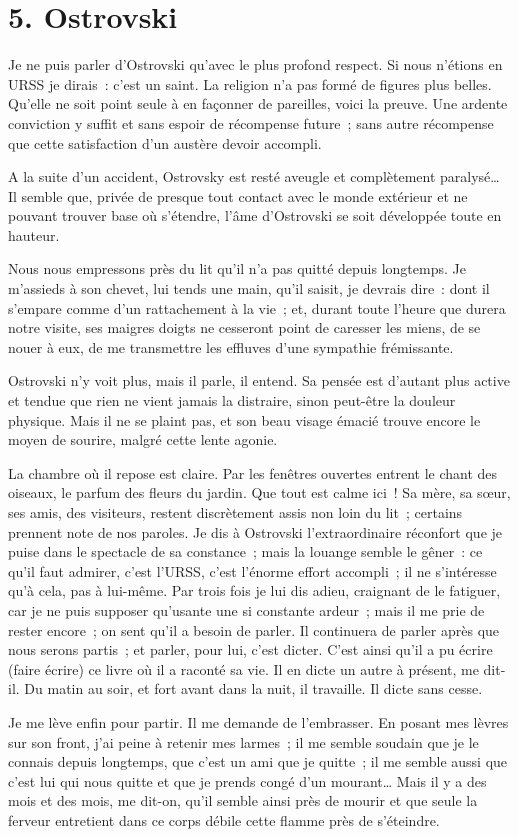 \documentclass[twoside]{book} %
\begin{document}
\section[{5. Ostrovski}]{5. Ostrovski}

\noindent Je ne puis parler d’Ostrovski qu’avec le plus profond respect. Si nous n’étions en URSS je dirais : c’est un saint. La religion n’a pas formé de figures plus belles. Qu’elle ne soit point seule à en façonner de pareilles, voici la preuve. Une ardente conviction y suffit et sans espoir de récompense future ; sans autre récompense que cette satisfaction d’un austère devoir accompli.\par
A la suite d’un accident, Ostrovsky est resté aveugle et complètement paralysé… Il semble que, privée de presque tout contact avec le monde extérieur et ne pouvant trouver base où s’étendre, l’âme d’Ostrovski se soit développée toute en hauteur.\par
Nous nous empressons près du lit qu’il n’a pas quitté depuis longtemps. Je m’assieds à son chevet, lui tends une main, qu’il saisit, je devrais dire : dont il s’empare comme d’un rattachement à la vie ; et, durant toute l’heure que durera notre visite, ses maigres doigts ne cesseront point de caresser les miens, de se nouer à eux, de me transmettre les effluves d’une sympathie frémissante.\par
Ostrovski n’y voit plus, mais il parle, il entend. Sa pensée est d’autant plus active et tendue que rien ne vient jamais la distraire, sinon peut-être la douleur physique. Mais il ne se plaint pas, et son beau visage émacié trouve encore le moyen de sourire, malgré cette lente agonie.\par
La chambre où il repose est claire. Par les fenêtres ouvertes entrent le chant des oiseaux, le parfum des fleurs du jardin. Que tout est calme ici ! Sa mère, sa sœur, ses amis, des visiteurs, restent discrètement assis non loin du lit ; certains prennent note de nos paroles. Je dis à Ostrovski l’extraordinaire réconfort que je puise dans le spectacle de sa constance ; mais la louange semble le gêner : ce qu’il faut admirer, c’est l’URSS, c’est l’énorme effort accompli ; il ne s’intéresse qu’à cela, pas à lui-même. Par trois fois je lui dis adieu, craignant de le fatiguer, car je ne puis supposer qu’usante une si constante ardeur ; mais il me prie de rester encore ; on sent qu’il a besoin de parler. Il continuera de parler après que nous serons partis ; et parler, pour lui, c’est dicter. C’est ainsi qu’il a pu écrire (faire écrire) ce livre où il a raconté sa vie. Il en dicte un autre à présent, me dit-il. Du matin au soir, et fort avant dans la nuit, il travaille. Il dicte sans cesse.\par
Je me lève enfin pour partir. Il me demande de l’embrasser. En posant mes lèvres sur son front, j’ai peine à retenir mes larmes ; il me semble soudain que je le connais depuis longtemps, que c’est un ami que je quitte ; il me semble aussi que c’est lui qui nous quitte et que je prends congé d’un mourant… Mais il y a des mois et des mois, me dit-on, qu’il semble ainsi près de mourir et que seule la ferveur entretient dans ce corps débile cette flamme près de s’éteindre.
\end{document}
